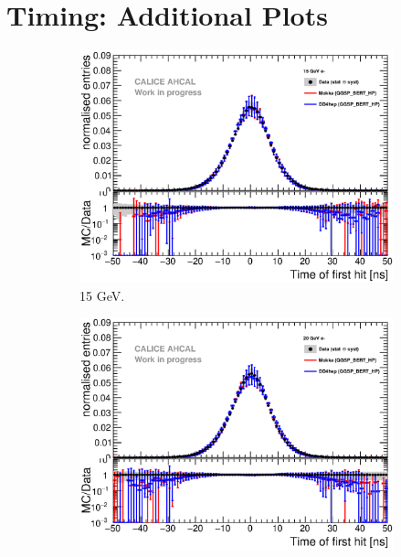 \chapter{Timing: Additional Plots}
\label{appendix:TimingAdd}

\begin{figure}[htbp!]
  \begin{subfigure}[t]{0.49\textwidth}
    \centering
    \includegraphics[width=1\textwidth]{../Thesis_Plots/Timing/Electrons/Plots/Comparison_SimData_Electrons15GeV.eps}
    \caption{15 GeV.}\label{fig:elec_sim_data_15GeV}
  \end{subfigure}
  \hfill
  \begin{subfigure}[t]{0.49\textwidth}
    \centering
    \includegraphics[width=1\textwidth]{../Thesis_Plots/Timing/Electrons/Plots/Comparison_SimData_Electrons20GeV.eps}

\end{subfigure}
\end{figure}
